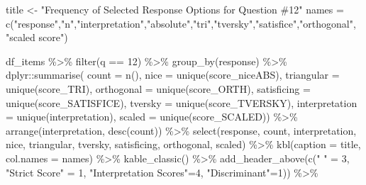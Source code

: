 \documentclass[
  letterpaper,
  DIV=11,
  numbers=noendperiod]{scrreprt}
\newenvironment{Shaded}{\begin{snugshade}}{\end{snugshade}}
\newcommand{\AttributeTok}[1]{\textcolor[rgb]{0.40,0.45,0.13}{#1}}
\newcommand{\DecValTok}[1]{\textcolor[rgb]{0.68,0.00,0.00}{#1}}
\newcommand{\FunctionTok}[1]{\textcolor[rgb]{0.28,0.35,0.67}{#1}}
\newcommand{\NormalTok}[1]{\textcolor[rgb]{0.00,0.23,0.31}{#1}}
\newcommand{\OtherTok}[1]{\textcolor[rgb]{0.00,0.23,0.31}{#1}}
\newcommand{\SpecialCharTok}[1]{\textcolor[rgb]{0.37,0.37,0.37}{#1}}
\newcommand{\StringTok}[1]{\textcolor[rgb]{0.13,0.47,0.30}{#1}}
\begin{document}
\begin{Shaded}
\begin{Highlighting}[]
\NormalTok{title }\OtherTok{\textless{}{-}} \StringTok{"Frequency of Selected Response Options for Question \#12"}
\NormalTok{names }\OtherTok{=} \FunctionTok{c}\NormalTok{(}\StringTok{"response"}\NormalTok{,}\StringTok{"n"}\NormalTok{,}\StringTok{"interpretation"}\NormalTok{,}\StringTok{"absolute"}\NormalTok{,}\StringTok{"tri"}\NormalTok{,}\StringTok{"tversky"}\NormalTok{,}\StringTok{"satisfice"}\NormalTok{,}\StringTok{"orthogonal"}\NormalTok{, }\StringTok{"scaled score"}\NormalTok{)}

\NormalTok{df\_items }\SpecialCharTok{\%\textgreater{}\%} \FunctionTok{filter}\NormalTok{(q }\SpecialCharTok{==} \DecValTok{12}\NormalTok{) }\SpecialCharTok{\%\textgreater{}\%} \FunctionTok{group\_by}\NormalTok{(response) }\SpecialCharTok{\%\textgreater{}\%}
\NormalTok{  dplyr}\SpecialCharTok{::}\FunctionTok{summarise}\NormalTok{( }\AttributeTok{count =} \FunctionTok{n}\NormalTok{(),}
                    \AttributeTok{nice =} \FunctionTok{unique}\NormalTok{(score\_niceABS),}
                    \AttributeTok{triangular =} \FunctionTok{unique}\NormalTok{(score\_TRI),}
                    \AttributeTok{orthogonal =}  \FunctionTok{unique}\NormalTok{(score\_ORTH),}
                    \AttributeTok{satisficing =}  \FunctionTok{unique}\NormalTok{(score\_SATISFICE),}
                    \AttributeTok{tversky =} \FunctionTok{unique}\NormalTok{(score\_TVERSKY),}
                    \AttributeTok{interpretation =} \FunctionTok{unique}\NormalTok{(interpretation),}
                    \AttributeTok{scaled =} \FunctionTok{unique}\NormalTok{(score\_SCALED)) }\SpecialCharTok{\%\textgreater{}\%}
  \FunctionTok{arrange}\NormalTok{(interpretation, }\FunctionTok{desc}\NormalTok{(count)) }\SpecialCharTok{\%\textgreater{}\%}
  \FunctionTok{select}\NormalTok{(response, count, interpretation, nice,}
\NormalTok{         triangular, tversky, satisficing, orthogonal, scaled) }\SpecialCharTok{\%\textgreater{}\%}
  \FunctionTok{kbl}\NormalTok{(}\AttributeTok{caption =}\NormalTok{ title, }\AttributeTok{col.names =}\NormalTok{ names) }\SpecialCharTok{\%\textgreater{}\%}  \FunctionTok{kable\_classic}\NormalTok{() }\SpecialCharTok{\%\textgreater{}\%}
  \FunctionTok{add\_header\_above}\NormalTok{(}\FunctionTok{c}\NormalTok{(}\StringTok{" "} \OtherTok{=} \DecValTok{3}\NormalTok{, }\StringTok{"Strict Score"} \OtherTok{=} \DecValTok{1}\NormalTok{, }\StringTok{"Interpretation Scores"}\OtherTok{=}\DecValTok{4}\NormalTok{, }\StringTok{"Discriminant"}\OtherTok{=}\DecValTok{1}\NormalTok{)) }\SpecialCharTok{\%\textgreater{}\%}

\end{Highlighting}
\end{Shaded}
\end{document}
